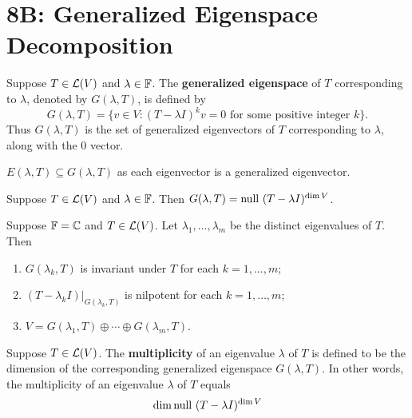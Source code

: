 \documentclass{extarticle}
\begin{document}
\newpage 
\section*{8B: Generalized Eigenspace Decomposition}

\begin{definition}
    Suppose \(T \in \mathcal{L}(V)\) and \(\lambda \in \mathbb{F}\). The \textbf{generalized eigenspace} of 
    \(T\) corresponding to \(\lambda\), denoted by \(G(\lambda, T)\), is defined by 
    \[G(\lambda, T) = \{v \in V \colon (T - \lambda I)^k v = 0 \text{ for some positive integer }k\}.\]
    Thus \(G(\lambda, T)\) is the set of generalized eigenvectors of \(T\) corresponding to \(\lambda\), 
    along with the 0 vector. 
\end{definition}

\begin{remark}
    \(E(\lambda, T) \subseteq G(\lambda, T)\) as each eigenvector is a generalized eigenvector.
\end{remark}

\begin{corollary}
    Suppose \(T \in \mathcal{L}(V)\) and \(\lambda \in \mathbb{F}\). Then \(G(\lambda, T) = \text{null } (T - \lambda I)^{\dim V}\).
\end{corollary}

\begin{thm}
    Suppose \(\mathbb{F} = \mathbb{C}\) and \(T \in \mathcal{L}(V)\). Let \(\lambda_1, \ldots, \lambda_m\) be the distinct 
    eigenvalues of \(T\). Then 
    \begin{enumerate}[label=(\alph*)]
        \item \(G(\lambda_k, T)\) is invariant under \(T\) for each \(k = 1, \ldots, m\); 
        \item \((T - \lambda_k I)|_{G(\lambda_k, T)}\) is nilpotent for each \(k = 1, \ldots, m\); 
        \item \(V = G(\lambda_1, T) \oplus \cdots \oplus G(\lambda_m, T)\).
    \end{enumerate}
\end{thm}

\begin{definition}[multiplicity]
    Suppose \(T \in \mathcal{L}(V)\). The \textbf{multiplicity} of an eigenvalue \(\lambda\) of 
    \(T\) is defined to be the dimension of the corresponding generalized eigenspace 
    \(G(\lambda, T)\). In other words, the multiplicity of an eigenvalue \(\lambda\) of \(T\)
    equals 
    \[\dim \text{null } (T -\lambda I)^{\dim V}\]
\end{definition}
\end{document}
